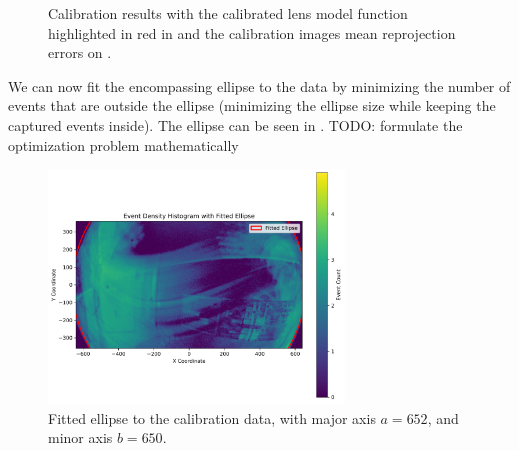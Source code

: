\begin{figure}[H]
	\centering
	\caption{
		Calibration results with the calibrated lens model function highlighted in red in  and the calibration images mean reprojection errors on .
  }
	\label{fig:calib_r}
\end{figure}

We can now fit the encompassing ellipse to the data by minimizing the number of events that are outside the ellipse (minimizing the ellipse size while keeping the
captured events inside). The ellipse can be seen in .
TODO: formulate the optimization problem mathematically
\begin{figure}[H]
	\centering
	\includegraphics[width=0.7\textwidth]{./fig/svg/ellipse_fit.pdf}
	\caption{Fitted ellipse to the calibration data, with major axis $a = 652$, and minor axis $b = 650$.}
	\label{fig:ellipse_fit}
\end{figure}

